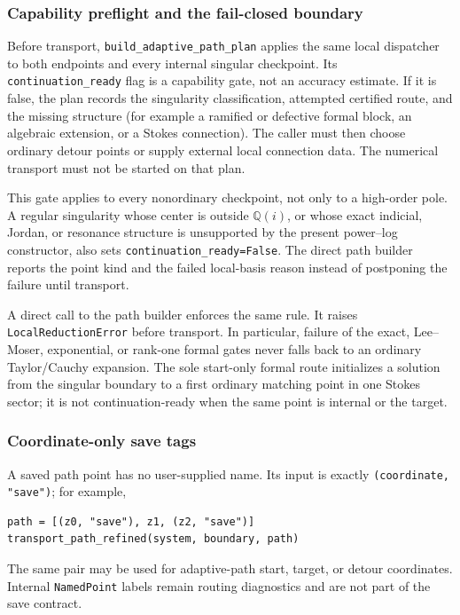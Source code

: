 \documentclass[11pt]{article}
\begin{document}
\subsubsection{Capability preflight and the fail-closed boundary}

Before transport, \texttt{build\_adaptive\_path\_plan} applies the same local dispatcher to
both endpoints and every internal singular checkpoint.  Its
\texttt{continuation\_ready} flag is a capability gate, not an accuracy estimate.  If it is
false, the plan records the singularity classification, attempted certified route, and the
missing structure (for example a ramified or defective formal block, an algebraic extension,
or a Stokes connection).  The caller must then choose ordinary detour points or supply external
local connection data.  The numerical transport must not be started on that plan.

This gate applies to every nonordinary checkpoint, not only to a high-order pole.  A regular
singularity whose center is outside $\mathbb Q(i)$, or whose exact indicial, Jordan, or
resonance structure is unsupported by the present power--log constructor, also sets
\texttt{continuation\_ready=False}.  The direct path builder reports the point kind and the
failed local-basis reason instead of postponing the failure until transport.

A direct call to the path builder enforces the same rule.  It raises
\texttt{LocalReductionError} before transport.  In particular, failure of the exact, Lee--Moser, exponential,
or rank-one formal gates never falls back to an ordinary Taylor/Cauchy expansion.  The sole
start-only formal route initializes a solution from the singular boundary to a first ordinary
matching point in one Stokes sector; it is not continuation-ready when the same point is
internal or the target.

\subsubsection{Coordinate-only save tags}

A saved path point has no user-supplied name.  Its input is exactly
\texttt{(coordinate, "save")}; for example,
\begin{verbatim}
path = [(z0, "save"), z1, (z2, "save")]
transport_path_refined(system, boundary, path)
\end{verbatim}
The same pair may be used for adaptive-path start, target, or detour coordinates.  Internal
\texttt{NamedPoint} labels remain routing diagnostics and are not part of the save contract.
\end{document}
